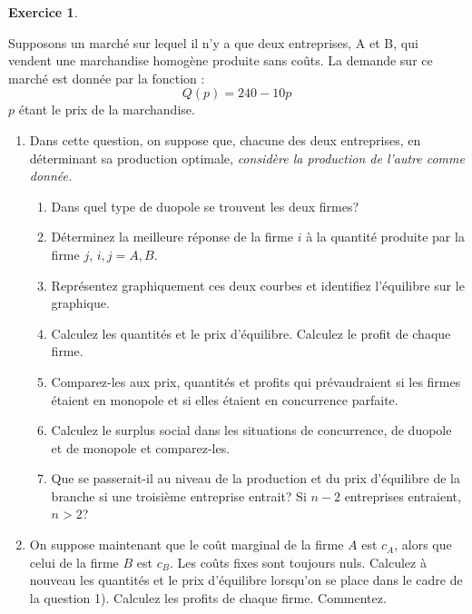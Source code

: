 \documentclass[
]{book}
\providecommand{\tightlist}{%
  \setlength{\itemsep}{0pt}\setlength{\parskip}{0pt}}
\theoremstyle{definition}
\theoremstyle{definition}
\theoremstyle{definition}
\newtheorem{exercise}{Exercice}[chapter]
\theoremstyle{definition}
\theoremstyle{remark}
\begin{document}
\begin{exercise}
\protect\hypertarget{exr:cournotexo2}{}\label{exr:cournotexo2}

Supposons un marché sur lequel il n'y a que deux entreprises, A et B, qui vendent une marchandise homogène produite sans coûts. La demande sur ce marché est donnée par la fonction :
\[Q\left(p\right)=240-10p\] \(p\) étant le prix de la marchandise.

\begin{enumerate}
\def\labelenumi{\arabic{enumi}.}
\tightlist
\item
  Dans cette question, on suppose que, chacune des deux entreprises, en déterminant sa production optimale, \emph{considère la production de l'autre comme donnée.}

  \begin{enumerate}
  \def\labelenumii{\alph{enumii}.}
  \tightlist
  \item
    Dans quel type de duopole se trouvent les deux firmes?
  \item
    Déterminez la meilleure réponse de la firme \(i\) à la quantité produite par la firme \(j\), \(i,j=A,B\).
  \item
    Représentez graphiquement ces deux courbes et identifiez l'équilibre sur le graphique.
  \item
    Calculez les quantités et le prix d'équilibre. Calculez le profit de chaque firme.
  \item
    Comparez-les aux prix, quantités et profits qui prévaudraient si les firmes étaient en monopole et si elles étaient en concurrence parfaite.
  \item
    Calculez le surplus social dans les situations de concurrence, de duopole et de monopole et comparez-les.
  \item
    Que se passerait-il au niveau de la production et du prix d'équilibre de la branche si une troisième entreprise entrait? Si \(n-2\) entreprises entraient, \(n>2\)?
  \end{enumerate}
\item
  On suppose maintenant que le coût marginal de la firme \(A\) est \(c_A\), alors que celui de la firme \(B\) est \(c_B\). Les coûts fixes sont toujours nuls.
  Calculez à nouveau les quantités et le prix d'équilibre lorsqu'on se place dans le cadre de la question 1). Calculez les profits de chaque firme. Commentez.
\end{enumerate}

\end{exercise}
\end{document}
